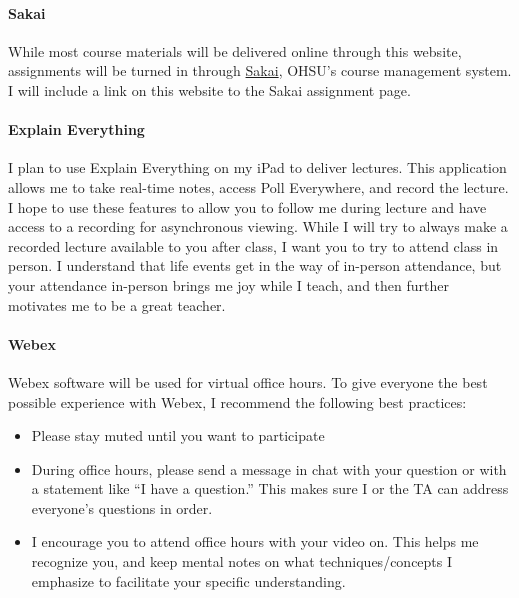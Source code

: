 \documentclass[
  letterpaper,
  DIV=11,
  numbers=noendperiod]{scrartcl}
\let\oldparagraph\paragraph
\renewcommand{\paragraph}[1]{\oldparagraph{#1}\mbox{}}
\providecommand{\tightlist}{%
  \setlength{\itemsep}{0pt}\setlength{\parskip}{0pt}}\usepackage{longtable,booktabs,array}
\begin{document}
\hypertarget{sakai}{%
\paragraph{Sakai}\label{sakai}}

While most course materials will be delivered online through this
website, assignments will be turned in through
\href{https://sakai.ohsu.edu/}{Sakai}, OHSU's course management system.
I will include a link on this website to the Sakai assignment page.~

\hypertarget{explain-everything}{%
\paragraph{Explain Everything}\label{explain-everything}}

I plan to use Explain Everything on my iPad to deliver lectures. This
application allows me to take real-time notes, access Poll Everywhere,
and record the lecture. I hope to use these features to allow you to
follow me during lecture and have access to a recording for asynchronous
viewing. While I will try to always make a recorded lecture available to
you after class, I want you to try to attend class in person. I
understand that life events get in the way of in-person attendance, but
your attendance in-person brings me joy while I teach, and then further
motivates me to be a great teacher.~

\hypertarget{webex}{%
\paragraph{Webex}\label{webex}}

Webex software will be used for virtual office hours. To give everyone
the best possible experience with Webex, I recommend the following best
practices:

\begin{itemize}
\tightlist
\item
  Please stay muted until you want to participate
\item
  During office hours, please send a message in chat with your question
  or with a statement like ``I have a question.'' This makes sure I or
  the TA can address everyone's questions in order.~
\item
  I encourage you to attend office hours with your video on. This helps
  me recognize you, and keep mental notes on what techniques/concepts I
  emphasize to facilitate your specific understanding.~
\end{itemize}
\end{document}
